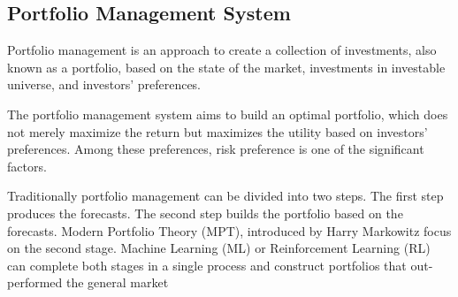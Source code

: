 \subsection {Portfolio Management System}
Portfolio management is an approach to create a collection of investments, also known as a portfolio, based on the state of the market, investments in investable universe, and investors' preferences.

The portfolio management system aims to build an optimal portfolio, which does not merely maximize the return but maximizes the utility based on investors' preferences. Among these preferences, risk preference is one of the significant factors.

Traditionally portfolio management can be divided into two steps. The first step produces the forecasts. The second step builds the portfolio based on the forecasts.  Modern Portfolio Theory (MPT), introduced by  Harry Markowitz \cite{10.2307/2975974} focus on the second stage. Machine Learning (ML) or Reinforcement Learning (RL) can complete both stages in a single process and construct portfolios that out-performed the general market\cite{KRAUSS2017689, moody2001learning}
